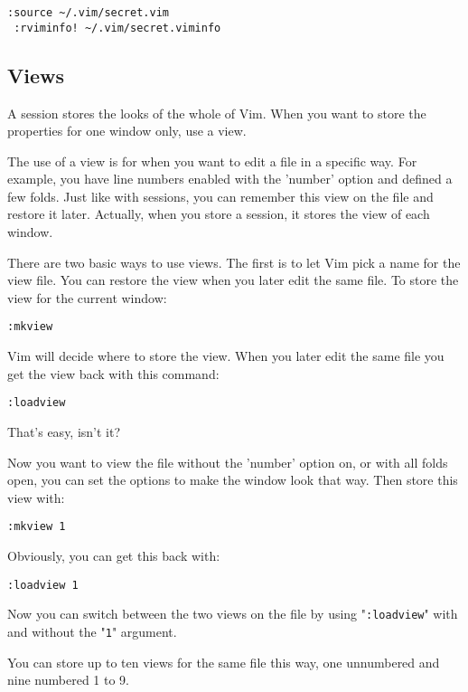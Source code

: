 \begin{Verbatim}[samepage=true]
 :source ~/.vim/secret.vim
 :rviminfo! ~/.vim/secret.viminfo
\end{Verbatim}
\subsection{Views}
A session stores the looks of the whole of Vim.
When you want to store the properties for one window only, use a view.

The use of a view is for when you want to edit a file in a specific way.
For example, you have line numbers enabled with the 'number' option and defined a few folds.
Just like with sessions, you can remember this view on the file and restore it later.
Actually, when you store a session, it stores the view of each window.

There are two basic ways to use views.
The first is to let Vim pick a name for the view file.
You can restore the view when you later edit the same file.
To store the view for the current window:

\begin{Verbatim}[samepage=true]
 :mkview
\end{Verbatim}

Vim will decide where to store the view.
When you later edit the same file you get the view back with this command:

\begin{Verbatim}[samepage=true]
 :loadview
\end{Verbatim}

That's easy, isn't it?

Now you want to view the file without the 'number' option on, or with all folds open, you can set the options to make the window look that way.
Then store this view with:

\begin{Verbatim}[samepage=true]
 :mkview 1
\end{Verbatim}

Obviously, you can get this back with:

\begin{Verbatim}[samepage=true]
 :loadview 1
\end{Verbatim}

Now you can switch between the two views on the file by using "\verb!:loadview!" with and without the "\verb!1!" argument.

You can store up to ten views for the same file this way, one unnumbered and nine numbered 1 to 9.

